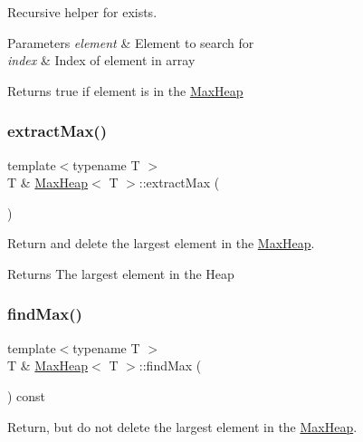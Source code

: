 Recursive helper for exists. 


\begin{DoxyParams}{Parameters}
{\em element} & Element to search for \\
\hline
{\em index} & Index of element in array \\
\hline
\end{DoxyParams}
\begin{DoxyReturn}{Returns}
true if element is in the \hyperlink{class_max_heap}{Max\+Heap} 
\end{DoxyReturn}
\mbox{\label{class_max_heap_a31f3fe175dce628b83f79c31805feb59}} 
\subsubsection{\texorpdfstring{extract\+Max()}{extractMax()}}
{\footnotesize\ttfamily template$<$typename T $>$ \\
T \& \hyperlink{class_max_heap}{Max\+Heap}$<$ T $>$\+::extract\+Max (\begin{DoxyParamCaption}{ }\end{DoxyParamCaption})}



Return and delete the largest element in the \hyperlink{class_max_heap}{Max\+Heap}. 

\begin{DoxyReturn}{Returns}
The largest element in the Heap 
\end{DoxyReturn}
\mbox{\label{class_max_heap_a03c0806bbc4c9c166c065a7c280457c4}} 
\subsubsection{\texorpdfstring{find\+Max()}{findMax()}}
{\footnotesize\ttfamily template$<$typename T $>$ \\
T \& \hyperlink{class_max_heap}{Max\+Heap}$<$ T $>$\+::find\+Max (\begin{DoxyParamCaption}{ }\end{DoxyParamCaption}) const}



Return, but do not delete the largest element in the \hyperlink{class_max_heap}{Max\+Heap}. 

